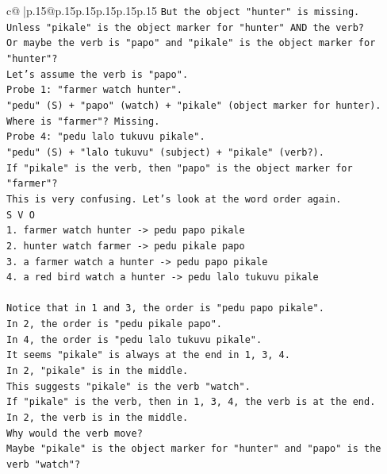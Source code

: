 \documentclass{article}
\begin{document}
{\begin{supertabular}{c@{$\;$}|p{.15\linewidth}@{}p{.15\linewidth}p{.15\linewidth}p{.15\linewidth}p{.15\linewidth}p{.15\linewidth}}
{{{\texttt{But the object "hunter" is missing.} \\
\texttt{Unless "pikale" is the object marker for "hunter" AND the verb?} \\
\texttt{Or maybe the verb is "papo" and "pikale" is the object marker for "hunter"?} \\
\texttt{Let's assume the verb is "papo".} \\
\texttt{Probe 1: "farmer watch hunter".} \\
\texttt{"pedu" (S) + "papo" (watch) + "pikale" (object marker for hunter).} \\
\texttt{Where is "farmer"? Missing.} \\
\texttt{Probe 4: "pedu lalo tukuvu pikale".} \\
\texttt{"pedu" (S) + "lalo tukuvu" (subject) + "pikale" (verb?).} \\
\texttt{If "pikale" is the verb, then "papo" is the object marker for "farmer"?} \\
\texttt{This is very confusing. Let's look at the word order again.} \\
\texttt{S V O} \\
\texttt{1. farmer watch hunter {-}> pedu papo pikale} \\
\texttt{2. hunter watch farmer {-}> pedu pikale papo} \\
\texttt{3. a farmer watch a hunter {-}> pedu papo pikale} \\
\texttt{4. a red bird watch a hunter {-}> pedu lalo tukuvu pikale} \\
\\ 
\texttt{Notice that in 1 and 3, the order is "pedu papo pikale".} \\
\texttt{In 2, the order is "pedu pikale papo".} \\
\texttt{In 4, the order is "pedu lalo tukuvu pikale".} \\
\texttt{It seems "pikale" is always at the end in 1, 3, 4.} \\
\texttt{In 2, "pikale" is in the middle.} \\
\texttt{This suggests "pikale" is the verb "watch".} \\
\texttt{If "pikale" is the verb, then in 1, 3, 4, the verb is at the end.} \\
\texttt{In 2, the verb is in the middle.} \\
\texttt{Why would the verb move?} \\
\texttt{Maybe "pikale" is the object marker for "hunter" and "papo" is the verb "watch"?} \\
}}}
\end{supertabular}}
\end{document}
